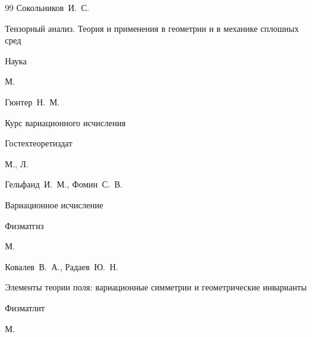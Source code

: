 \begin{thebibliography}{99}
\by Сокольников~И.~С.

\book  Тензорный анализ. Теория и применения в геометрии и в механике сплошных сред


\publ Наука

\publaddr М.





\by Гюнтер~Н.~М.

\book   Курс вариационного исчисления


\publ  Гостехтеоретиздат

\publaddr М., Л.





\by Гельфанд~И.~М., Фомин~С.~В.

\book   Вариационное исчисление


\publ Физматгиз

\publaddr М.





\by Ковалев~В.~А., Радаев~Ю.~Н.

\book Элементы теории поля: вариационные симметрии и геометрические инварианты


\publ Физматлит

\publaddr М.




\end{thebibliography}






\newpage



\makeentitle



\vspace{-5mm}






